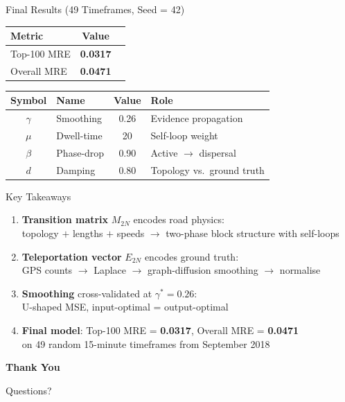 \documentclass[aspectratio=169,12pt]{beamer}
\newcommand{\highlight}[1]{\textcolor{accent}{\textbf{#1}}}
\newcommand{\good}[1]{\textcolor{good}{\textbf{#1}}}
\begin{document}
\begin{frame}{Final Results (49 Timeframes, Seed = 42)}
  \centering
  \begin{tabular}{lcc}
    \toprule
    \textbf{Metric} & \textbf{Value}\\
    \midrule
    Top-100 MRE & \good{0.0317}\\
    Overall MRE & \good{0.0471}\\
    \bottomrule
  \end{tabular}

  \bigskip
  \begin{tabular}{clcl}
    \toprule
    Symbol & Name & Value & Role\\
    \midrule
    $\gamma$ & Smoothing & 0.26 & Evidence propagation\\
    $\mu$ & Dwell-time & 20 & Self-loop weight\\
    $\beta$ & Phase-drop & 0.90 & Active $\to$ dispersal\\
    $d$ & Damping & 0.80 & Topology vs.\ ground truth\\
    \bottomrule
  \end{tabular}
\end{frame}

\begin{frame}{Key Takeaways}
  \begin{enumerate}
    \item \highlight{Transition matrix} $M_{2N}$ encodes road physics:\\
          topology $+$ lengths $+$ speeds $\to$ two-phase block structure with self-loops
    \bigskip
    \item \highlight{Teleportation vector} $E_{2N}$ encodes ground truth:\\
          GPS counts $\to$ Laplace $\to$ graph-diffusion smoothing $\to$ normalise
    \bigskip
    \item \highlight{Smoothing} cross-validated at $\gamma^* = 0.26$:\\
          U-shaped MSE, input-optimal = output-optimal
    \bigskip
    \item \highlight{Final model}: Top-100 MRE = \good{0.0317},
          Overall MRE = \good{0.0471}\\
          on 49 random 15-minute timeframes from September 2018
  \end{enumerate}
\end{frame}

\begin{frame}{}
  \centering
  \vfill
  {\Huge\highlight{Thank You}}

  \vfill
  {\large Questions?}
  \vfill
\end{frame}
\end{document}
